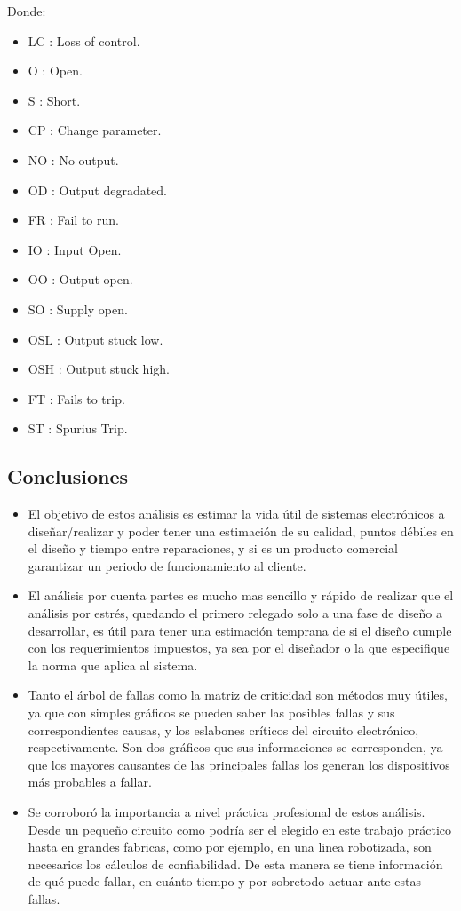\documentclass{article}
\begin{document}
Donde:
\begin{itemize}
	\item LC : Loss of control.
	\item O : Open.
	\item S : Short.
	\item CP : Change parameter.
	\item NO : No output.
	\item OD : Output degradated.
	\item FR : Fail to run.
	\item IO : Input Open.
	\item OO : Output open.
	\item SO : Supply open.
	\item OSL : Output stuck low.
	\item OSH : Output stuck high.
	\item FT : Fails to trip.
	\item ST : Spurius Trip.
\end{itemize}
\clearpage

\subsection {Conclusiones}

\begin{itemize}
	\item El objetivo de estos análisis es estimar la vida útil de sistemas electrónicos a diseñar/realizar y poder tener una estimación de su calidad, puntos débiles en el diseño y tiempo entre reparaciones, y si es un producto comercial garantizar un periodo de funcionamiento al cliente.

\item El análisis por cuenta partes es mucho mas sencillo y rápido de realizar que el análisis por estrés, quedando el primero relegado solo a una fase de diseño a desarrollar, es útil para tener una estimación temprana de si el diseño cumple con los requerimientos impuestos, ya sea por el diseñador o la que especifique la norma que aplica al sistema.

	\item Tanto el árbol de fallas como la matriz de criticidad son métodos muy útiles, ya que con simples gráficos se pueden saber las posibles fallas y sus correspondientes causas, y los eslabones críticos del circuito electrónico, respectivamente. Son dos gráficos que sus informaciones se corresponden, ya que los mayores causantes de las principales fallas los generan los dispositivos más probables a fallar. 


  \item Se corroboró la importancia a nivel práctica profesional de estos análisis. Desde un pequeño circuito como podría ser el elegido en este trabajo práctico hasta en grandes fabricas, como por ejemplo, en una linea robotizada, son necesarios los cálculos de confiabilidad. De esta manera se tiene información de qué puede fallar, en cuánto tiempo y por sobretodo actuar ante estas fallas.
\end{itemize}
\end{document}
